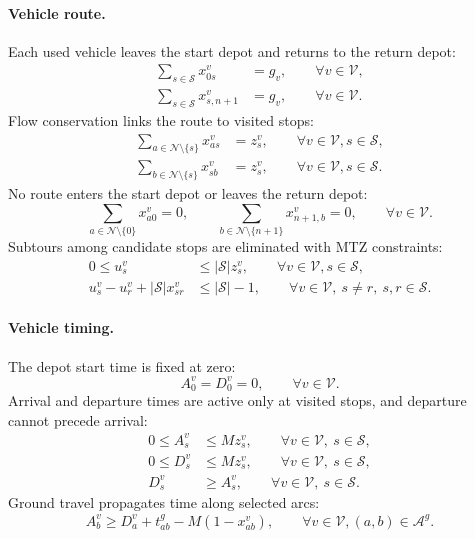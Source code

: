 \paragraph{Vehicle route.}
Each used vehicle leaves the start depot and returns to the return depot:
\begin{align}
\sum_{s\in\mathcal{S}}x^v_{0s}&=g_v,
\qquad \forall v\in\mathcal{V},
\label{eq:sb-start-depot}\\
\sum_{s\in\mathcal{S}}x^v_{s,n+1}&=g_v,
\qquad \forall v\in\mathcal{V}.
\label{eq:sb-return-depot}
\end{align}
Flow conservation links the route to visited stops:
\begin{align}
\sum_{a\in\mathcal{N}\setminus\{s\}}x^v_{as}&=z^v_s,
\qquad \forall v\in\mathcal{V},s\in\mathcal{S},
\label{eq:sb-inflow}\\
\sum_{b\in\mathcal{N}\setminus\{s\}}x^v_{sb}&=z^v_s,
\qquad \forall v\in\mathcal{V},s\in\mathcal{S}.
\label{eq:sb-outflow}
\end{align}
No route enters the start depot or leaves the return depot:
\begin{equation}
\sum_{a\in\mathcal{N}\setminus\{0\}}x^v_{a0}=0,\qquad
\sum_{b\in\mathcal{N}\setminus\{n+1\}}x^v_{n+1,b}=0,
\qquad \forall v\in\mathcal{V}.
\label{eq:sb-depot-direction}
\end{equation}
Subtours among candidate stops are eliminated with MTZ constraints:
\begin{align}
0\leq u^v_s &\leq |\mathcal{S}|z^v_s,
\qquad \forall v\in\mathcal{V},s\in\mathcal{S},
\label{eq:sb-mtz-bound}\\
u^v_s-u^v_r+|\mathcal{S}|x^v_{sr}
&\leq |\mathcal{S}|-1,
\qquad \forall v\in\mathcal{V},\ s\neq r,\ s,r\in\mathcal{S}.
\label{eq:sb-mtz}
\end{align}

\paragraph{Vehicle timing.}
The depot start time is fixed at zero:
\begin{equation}
A^v_0=D^v_0=0,
\qquad \forall v\in\mathcal{V}.
\label{eq:sb-depot-time}
\end{equation}
Arrival and departure times are active only at visited stops, and departure cannot precede arrival:
\begin{align}
0\leq A^v_s &\leq Mz^v_s,
\qquad \forall v\in\mathcal{V},\ s\in\mathcal{S},
\label{eq:sb-arrival-active}\\
0\leq D^v_s &\leq Mz^v_s,
\qquad \forall v\in\mathcal{V},\ s\in\mathcal{S},
\label{eq:sb-departure-active}\\
D^v_s &\geq A^v_s,
\qquad \forall v\in\mathcal{V},\ s\in\mathcal{S}.
\label{eq:sb-departure-after-arrival}
\end{align}
Ground travel propagates time along selected arcs:
\begin{equation}
A^v_b\geq D^v_a+t^g_{ab}-M(1-x^v_{ab}),
\qquad \forall v\in\mathcal{V},(a,b)\in\mathcal{A}^g.
\label{eq:sb-ground-time}
\end{equation}

